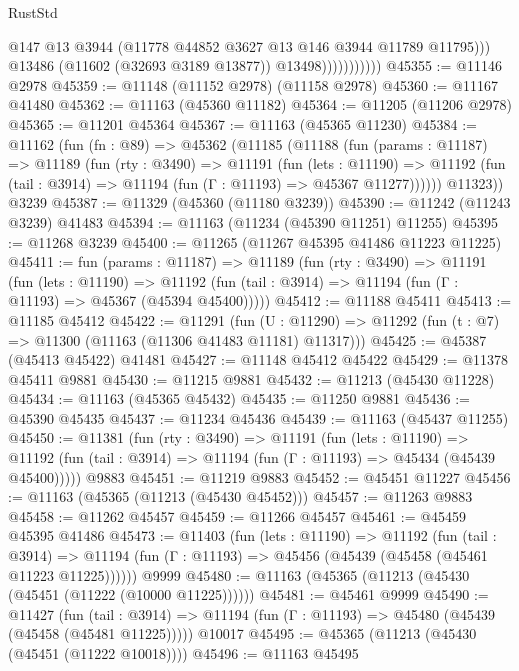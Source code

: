 \begin{lexlean}{RustStd}
\begin{coremodule}
                              @147
                              @13
                              @3944
                              (@11778 @44852 @3627 @13 @146 @3944 @11789 @11795)))
                          @13486
                          (@11602 (@32693 @3189 @13877))
                          @13498)))))))))))
@45355 := @11146 @2978
@45359 := @11148 (@11152 @2978) (@11158 @2978)
@45360 := @11167 @41480
@45362 := @11163 (@45360 @11182)
@45364 := @11205 (@11206 @2978)
@45365 := @11201 @45364
@45367 := @11163 (@45365 @11230)
@45384 := @11162
    (fun (fn : @89) =>
    @45362
      (@11185
        (@11188
          (fun (params : @11187) =>
          @11189
            (fun (rty : @3490) =>
            @11191
              (fun (lets : @11190) =>
              @11192 (fun (tail : @3914) => @11194 (fun (Γ : @11193) => @45367 @11277))))))
        @11323))
    @3239
@45387 := @11329 (@45360 (@11180 @3239))
@45390 := @11242 (@11243 @3239) @41483
@45394 := @11163 (@11234 (@45390 @11251) @11255)
@45395 := @11268 @3239
@45400 := @11265 (@11267 @45395 @41486 @11223 @11225)
@45411 := fun (params : @11187) =>
  @11189
    (fun (rty : @3490) =>
    @11191
      (fun (lets : @11190) =>
      @11192 (fun (tail : @3914) => @11194 (fun (Γ : @11193) => @45367 (@45394 @45400)))))
@45412 := @11188 @45411
@45413 := @11185 @45412
@45422 := @11291
    (fun (U : @11290) => @11292 (fun (t : @7) => @11300 (@11163 (@11306 @41483 @11181) @11317)))
@45425 := @45387 (@45413 @45422) @41481
@45427 := @11148 @45412 @45422
@45429 := @11378 @45411 @9881
@45430 := @11215 @9881
@45432 := @11213 (@45430 @11228)
@45434 := @11163 (@45365 @45432)
@45435 := @11250 @9881
@45436 := @45390 @45435
@45437 := @11234 @45436
@45439 := @11163 (@45437 @11255)
@45450 := @11381
    (fun (rty : @3490) =>
    @11191
      (fun (lets : @11190) =>
      @11192 (fun (tail : @3914) => @11194 (fun (Γ : @11193) => @45434 (@45439 @45400)))))
    @9883
@45451 := @11219 @9883
@45452 := @45451 @11227
@45456 := @11163 (@45365 (@11213 (@45430 @45452)))
@45457 := @11263 @9883
@45458 := @11262 @45457
@45459 := @11266 @45457
@45461 := @45459 @45395 @41486
@45473 := @11403
    (fun (lets : @11190) =>
    @11192
      (fun (tail : @3914) =>
      @11194 (fun (Γ : @11193) => @45456 (@45439 (@45458 (@45461 @11223 @11225))))))
    @9999
@45480 := @11163 (@45365 (@11213 (@45430 (@45451 (@11222 (@10000 @11225))))))
@45481 := @45461 @9999
@45490 := @11427
    (fun (tail : @3914) => @11194 (fun (Γ : @11193) => @45480 (@45439 (@45458 (@45481 @11225)))))
    @10017
@45495 := @45365 (@11213 (@45430 (@45451 (@11222 @10018))))
@45496 := @11163 @45495

\end{coremodule}
\end{lexlean}
